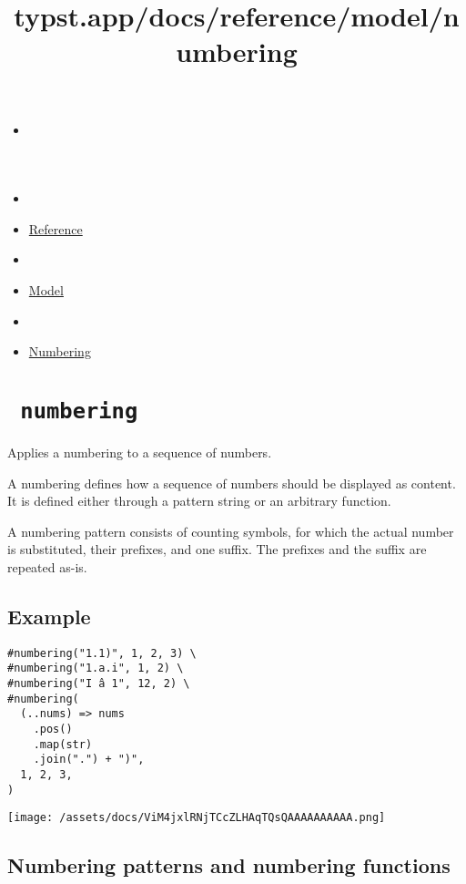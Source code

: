 \title{typst.app/docs/reference/model/numbering}

\begin{itemize}
\tightlist
\item
  \href{/docs}{}
\item
  
\item
  \href{/docs/reference/}{Reference}
\item
  
\item
  \href{/docs/reference/model/}{Model}
\item
  
\item
  \href{/docs/reference/model/numbering/}{Numbering}
\end{itemize}

\section{\texorpdfstring{\texttt{\ numbering\ }}{ numbering }}\label{summary}

Applies a numbering to a sequence of numbers.

A numbering defines how a sequence of numbers should be displayed as
content. It is defined either through a pattern string or an arbitrary
function.

A numbering pattern consists of counting symbols, for which the actual
number is substituted, their prefixes, and one suffix. The prefixes and
the suffix are repeated as-is.

\subsection{Example}\label{example}

\begin{verbatim}
#numbering("1.1)", 1, 2, 3) \
#numbering("1.a.i", 1, 2) \
#numbering("I â 1", 12, 2) \
#numbering(
  (..nums) => nums
    .pos()
    .map(str)
    .join(".") + ")",
  1, 2, 3,
)
\end{verbatim}

\texttt{[image: /assets/docs/ViM4jxlRNjTCcZLHAqTQsQAAAAAAAAAA.png]}

\subsection{Numbering patterns and numbering
functions}\label{numbering-patterns-and-numbering-functions}

